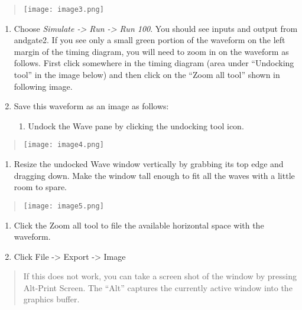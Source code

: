 \begin{quote}
\texttt{[image: image3.png]}
\end{quote}

\begin{enumerate}
\def\labelenumi{\arabic{enumi}.}
\setcounter{enumi}{21}
\item
  Choose \emph{Simulate -\textgreater{} Run -\textgreater{} Run 100}.
  You should see inputs and output from andgate2. If you see only a
  small green portion of the waveform on the left margin of the timing
  diagram, you will need to zoom in on the waveform as follows. First
  click somewhere in the timing diagram (area under ``Undocking tool''
  in the image below) and then click on the ``Zoom all tool'' shown in
  following image.
\item
  \protect\hypertarget{Part_1_Step_23}{}{}Save this waveform as an image
  as follows:

  \begin{enumerate}
  \def\labelenumii{\alph{enumii}.}
  \item
    Undock the Wave pane by clicking the undocking tool icon.
  \end{enumerate}
\end{enumerate}

\begin{quote}
\texttt{[image: image4.png]}
\end{quote}

\begin{enumerate}
\def\labelenumi{\alph{enumi}.}
\setcounter{enumi}{1}
\item
  Resize the undocked Wave window vertically by grabbing its top edge
  and dragging down. Make the window tall enough to fit all the waves
  with a little room to spare.
\end{enumerate}

\begin{quote}
\texttt{[image: image5.png]}
\end{quote}

\begin{enumerate}
\def\labelenumi{\alph{enumi}.}
\setcounter{enumi}{2}
\item
  Click the Zoom all tool to file the available horizontal space with
  the waveform.
\item
  Click File -\textgreater{} Export -\textgreater{} Image
\end{enumerate}

\begin{quote}
If this does not work, you can take a screen shot of the window by
pressing Alt-Print Screen. The ``Alt'' captures the currently active
window into the graphics buffer.
\end{quote}

